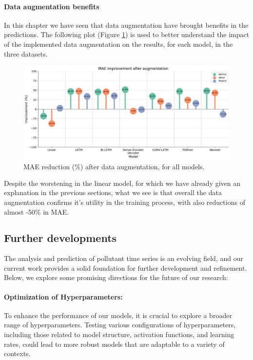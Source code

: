 \paragraph{Data augmentation benefits}

In this chapter we have seen that data augmentation have brought benefits in the predictions. The following plot (Figure \ref{fig:augmentation-improv}) is used to better understand the impact of the implemented data augmentation on the results, for each model, in the three datasets.

\begin{figure}[h]
    \centering
    \includegraphics[width=1\linewidth]{images/improvement with augmentation.png}
    \caption{MAE reduction (\%) after data augmentation, for all models.}
    \label{fig:augmentation-improv}
\end{figure}

Despite the worstening in the linear model, for which we have already given an explanation in the previous sections, what we see is that overall the data augmentation confirms it's utility in the training process, with also reductions of almost -50\% in MAE. 

\subsection*{Further developments}

The analysis and prediction of pollutant time series is an evolving field, and our current work provides a solid foundation for further development and refinement. Below, we explore some promising directions for the future of our research:

\paragraph{Optimization of Hyperparameters:}
To enhance the performance of our models, it is crucial to explore a broader range of hyperparameters. Testing various configurations of hyperparameters, including those related to model structure, activation functions, and learning rates, could lead to more robust models that are adaptable to a variety of contexts.

